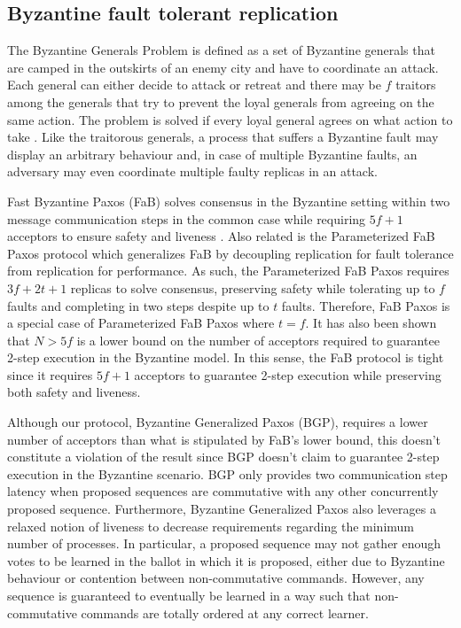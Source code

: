 \subsection{Byzantine fault tolerant replication} \label{Non-Crash}
The Byzantine Generals Problem is defined as a set of Byzantine generals that are camped in the outskirts of an enemy city and have to coordinate an attack. Each general can either decide to attack or retreat and there may be $f$ traitors among the generals that try to prevent the loyal generals from agreeing on the same action. The problem is solved if every loyal general agrees on what action to take \cite{LSP82}. Like the traitorous generals, a process that suffers a Byzantine fault may display an arbitrary behaviour and, in case of multiple Byzantine faults, an adversary may even coordinate multiple faulty replicas in an attack. \par
Fast Byzantine Paxos (FaB) solves consensus in the Byzantine setting within two message communication steps in the common case while requiring $5f+1$ acceptors to ensure safety and liveness \cite{Martin2006}. Also related is the Parameterized FaB Paxos protocol which generalizes FaB by decoupling replication for fault tolerance from replication for performance. As such, the Parameterized FaB Paxos requires $3f+2t+1$ replicas to solve consensus, preserving safety while tolerating up to $f$ faults and completing in two steps despite up to $t$ faults. Therefore, FaB Paxos is a special case of Parameterized FaB Paxos where $t=f$. It has also been shown that $N>5f$ is a lower bound on the number of acceptors required to guarantee 2-step execution in the Byzantine model. In this sense, the FaB protocol is tight since it requires $5f+1$ acceptors to guarantee 2-step execution while preserving both safety and liveness. \par
Although our protocol, Byzantine Generalized Paxos (BGP), requires a lower number of acceptors than what is stipulated by FaB's lower bound, this doesn't constitute a violation of the result since BGP doesn't claim to guarantee 2-step execution in the Byzantine scenario. BGP only provides two communication step latency when proposed sequences are commutative with any other concurrently proposed sequence. Furthermore, Byzantine Generalized Paxos also leverages a relaxed notion of liveness to decrease requirements regarding the minimum number of processes. In particular, a proposed sequence may not gather enough votes to be learned in the ballot in which it is proposed, either due to Byzantine behaviour or contention between non-commutative commands. However, any sequence is guaranteed to eventually be learned in a way such that non-commutative commands are totally ordered at any correct learner.
